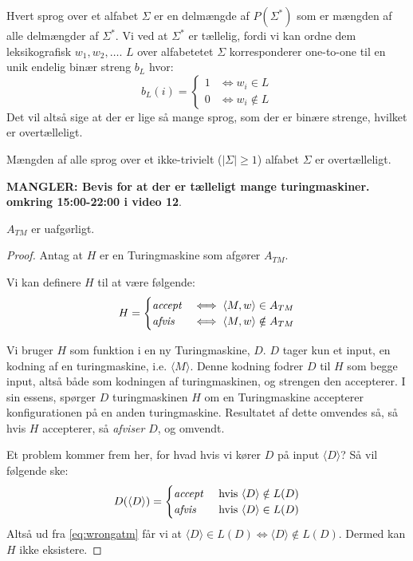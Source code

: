 Hvert sprog over et alfabet $\Sigma$ er en delmængde af $P(\Sigma^{*})$ som er mængden af alle delmængder af $\Sigma^{*}$.  Vi ved at $\Sigma^{*}$ er tællelig, fordi vi kan ordne dem leksikografisk $w_{1}, w_{2}, \ldots$. $L$ over alfabetetet $\Sigma$ korresponderer one-to-one til en unik endelig binær streng $b_{L}$ hvor:
\begin{equation}
	b_{L}(i) = \begin{cases}
		1 & \iff w_{i} \in L    \\
		0 & \iff w_{i} \notin L
	\end{cases}
\end{equation}
Det vil altså sige at der er lige så mange sprog, som der er binære strenge, hvilket er overtælleligt.

\begin{corollary}
	Mængden af alle sprog over et ikke-trivielt (\( |\Sigma| \ge 1\)) alfabet \(\Sigma\) er overtælleligt.
\end{corollary}


\textbf{MANGLER: Bevis for at der er tælleligt mange turingmaskiner. omkring 15:00-22:00 i video 12}.

\begin{theorem}
	$A_{TM}$ er uafgørligt.
\end{theorem}

\begin{proof}
	Antag at $H$ er en Turingmaskine som afgører $A_{TM}$.

	Vi kan definere $H$ til at være følgende:
	\begin{equation}
		H = \begin{cases}
			\text{\textit{accept}} & \iff \langle M, w\rangle \in A_{TM}     \\
			\text{\textit{afvis}}  & \iff \langle M, w \rangle \notin A_{TM}
		\end{cases}
	\end{equation}

	Vi bruger $H$ som funktion i en ny Turingmaskine, $D$. $D$ tager kun et input, en kodning af en turingmaskine, i.e. $\langle M \rangle$. Denne kodning fodrer $D$ til $H$ som begge input, altså både som kodningen af turingmaskinen, og strengen den accepterer. I sin essens, spørger $D$ turingmaskinen $H$ om en Turingmaskine accepterer konfigurationen på en anden turingmaskine. Resultatet af dette omvendes så, så hvis $H$ accepterer, så \textit{afviser} $D$, og omvendt.

	Et problem kommer frem her, for hvad hvis vi kører $D$ på input $\langle D \rangle$? Så vil følgende ske:
	\begin{equation}
		\label{eq:wrongatm}
		D(\langle D \rangle ) = \begin{cases}
			\text{\textit{accept}} & \text{ hvis } \langle D \rangle \notin L(D) \\
			\text{\textit{afvis}}  & \text{ hvis } \langle D \rangle \in L(D)    \\
		\end{cases}
	\end{equation}
	Altså ud fra \eqref{eq:wrongatm} får vi at $\langle D \rangle \in L(D) \iff \langle D \rangle \notin L(D)$. Dermed kan $H$ ikke eksistere.
\end{proof}

